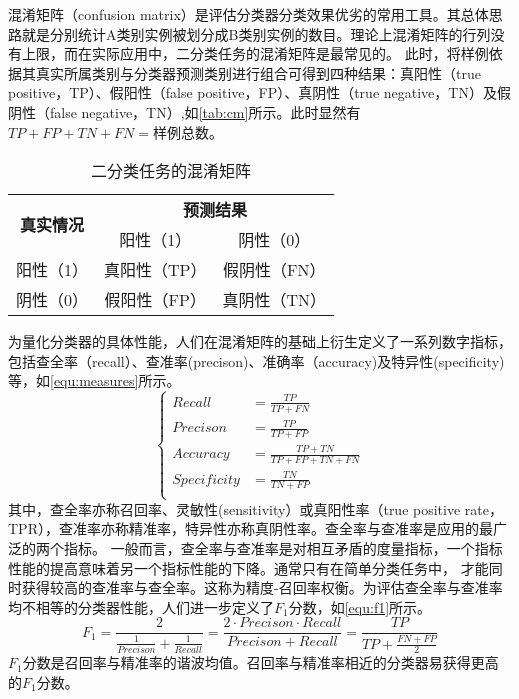 混淆矩阵（confusion matrix）是评估分类器分类效果优劣的常用工具\cite{Zhou2016,Aurélien2018}。其总体思路就是分别统计A类别实例被划分成B类别实例的数目。理论上混淆矩阵的行列没有上限，而在实际应用中，二分类任务的混淆矩阵是最常见的。
此时，将样例依据其真实所属类别与分类器预测类别进行组合可得到四种结果：真阳性（true positive，TP）、假阳性（false positive，FP）、真阴性（true negative，TN）及假阴性（false negative，TN）,如\autoref{tab:cm}所示。此时显然有
$TP+FP+TN+FN=\text{样例总数}$。
\begin{table}[htbp]
      \centering
      \caption{\label{tab:cm}二分类任务的混淆矩阵}
      \begin{tabular}{ccc}
      \toprule
      \multicolumn{1}{c}{\multirow{2}[4]{*}{\textbf{真实情况}}} & \multicolumn{2}{c}{\textbf{预测结果}} \\
            \cmidrule{2-3}          & 阳性（1） & 阴性（0） \\
      \midrule
      阳性（1） & 真阳性（TP） & 假阴性（FN） \\
      阴性（0） & 假阳性（FP） & 真阴性（TN） \\
      \bottomrule
      \end{tabular}%
\end{table}%

为量化分类器的具体性能，人们在混淆矩阵的基础上衍生定义了一系列数字指标，包括查全率（recall）、查准率(precison)、准确率（accuracy)及特异性(specificity)等，如\autoref{equ:measures}所示。
\begin{equation}
      \label{equ:measures}
      \left \{
      \begin{aligned}
            Recall      &=\frac{TP}{TP+FN}         \\
            Precison    &=\frac{TP}{TP+FP}          \\
            Accuracy    &=\frac{TP+TN}{TP+FP+TN+FN} \\
            Specificity &=\frac{TN}{TN+FP}       \\
      \end{aligned}
      \right.
\end{equation}
其中，查全率亦称召回率、灵敏性(sensitivity）或真阳性率（true positive rate，TPR），查准率亦称精准率，特异性亦称真阴性率。查全率与查准率是应用的最广泛的两个指标\cite{Zhou2016,Aurélien2018}。
一般而言，查全率与查准率是对相互矛盾的度量指标，一个指标性能的提高意味着另一个指标性能的下降。通常只有在简单分类任务中，
才能同时获得较高的查准率与查全率。这称为精度-召回率权衡。为评估查全率与查准率均不相等的分类器性能，人们进一步定义了$F_1\text{分数}$，如\autoref{equ:f1}所示。
\begin{equation}
      \label{equ:f1}
      F_1=\frac{2}{\frac{1}{Precison}+\frac{1}{Recall}}=\frac{2\cdot Precison\cdot Recall}{Precison+Recall}=\frac{TP}{TP+\frac{FN+FP}{2}}
\end{equation}
$F_1\text{分数}$是召回率与精准率的谐波均值。召回率与精准率相近的分类器易获得更高的$F_1\text{分数}$。

